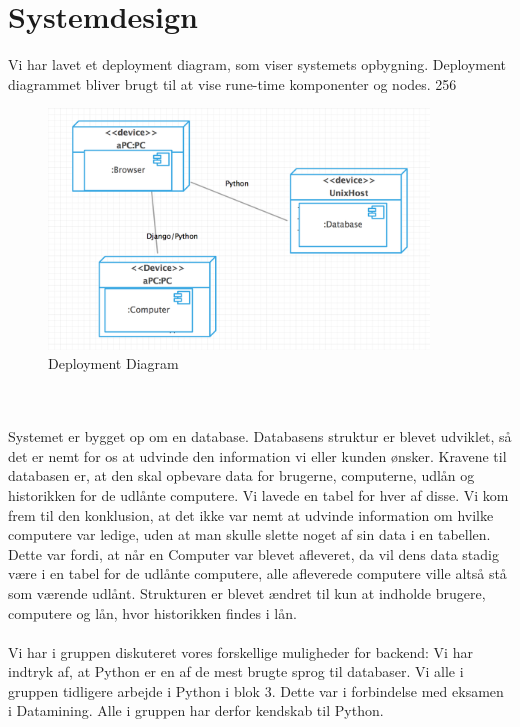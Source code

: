 \documentclass[a4paper]{article}
\begin{document}
\section{Systemdesign}
Vi har lavet et deployment diagram, som viser systemets opbygning. Deployment diagrammet bliver brugt til at vise rune-time komponenter og nodes. \cite{OOSE}{256}
\begin{figure}[h!]
\includegraphics[width=0.9\textwidth]{deploymentdiagram.png}
  \caption{Deployment Diagram}
  \centering
\end{figure} \\ \\
Systemet er bygget op om en database. Databasens struktur er blevet udviklet, så det er nemt for os at udvinde den information vi eller kunden ønsker. Kravene til databasen er, at den skal opbevare data for brugerne, computerne, udlån og historikken for de udlånte computere. Vi lavede en tabel for hver af disse. Vi kom frem til den konklusion, at det ikke var nemt at udvinde information om hvilke computere var ledige, uden at man skulle slette noget af sin data i en tabellen. Dette var fordi, at når en Computer var blevet afleveret, da vil dens data stadig være i en tabel for de udlånte computere, alle afleverede computere ville altså stå som værende udlånt. Strukturen er blevet ændret til kun at indholde brugere, computere og lån, hvor historikken findes i lån. \\ \\
Vi har i gruppen diskuteret vores forskellige muligheder for backend:
Vi har indtryk af, at Python er en af de mest brugte sprog til databaser. Vi alle i gruppen tidligere arbejde i Python i blok 3. Dette var i forbindelse med eksamen i Datamining. Alle i gruppen har derfor kendskab til Python.\\ \\
\end{document}
